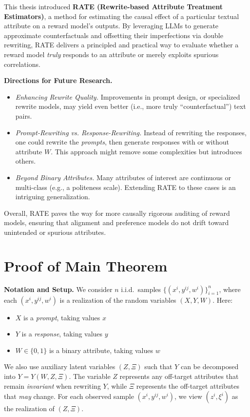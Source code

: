 This thesis introduced \textbf{RATE (Rewrite-based Attribute Treatment Estimators)}, a method for estimating the causal effect of a particular textual attribute on a reward model’s outputs. By leveraging LLMs to generate approximate counterfactuals and offsetting their imperfections via double rewriting, RATE delivers a principled and practical way to evaluate whether a reward model \emph{truly} responds to an attribute or merely exploits spurious correlations.

\textbf{Directions for Future Research.}
\begin{itemize}
    \item \emph{Enhancing Rewrite Quality.} Improvements in prompt design, or specialized rewrite models, may yield even better (i.e., more truly ``counterfactual'') text pairs.
    \item \emph{Prompt-Rewriting vs. Response-Rewriting.} Instead of rewriting the responses, one could rewrite the \emph{prompts}, then generate responses with or without attribute $W$. This approach might remove some complexities but introduces others.
    \item \emph{Beyond Binary Attributes.} Many attributes of interest are continuous or multi-class (e.g., a politeness scale). Extending RATE to these cases is an intriguing generalization.
\end{itemize}

Overall, RATE paves the way for more causally rigorous auditing of reward models, ensuring that alignment and preference models do not drift toward unintended or spurious attributes.

\newpage
\appendix
\section{Proof of Main Theorem}
\label{sec:proofs}
\noindent
\textbf{Notation and Setup.}
We consider $n$ i.i.d.\ samples $\{(x^i, y^{ij}, w^i)\}_{i=1}^n$, where each $(x^i, y^{ij}, w^i)$ is a realization of the random variables $(X, Y, W)$. Here:
\begin{itemize}
    \item $X$ is a \emph{prompt}, taking values $x$
    \item $Y$ is a \emph{response}, taking values $y$
    \item $W \in \{0,1\}$ is a binary attribute, taking values $w$
\end{itemize}
We also use auxiliary latent variables $(Z, \Xi)$ such that $Y$ can be decomposed into $Y = Y(W, Z, \Xi)$. The variable $Z$ represents any off-target attributes that remain \emph{invariant} when rewriting $Y$, while $\Xi$ represents the off-target attributes that \emph{may} change. For each observed sample $(x^i, y^{ij}, w^i)$, we view $(z^i,\xi^i)$ as the realization of $(Z, \Xi)$.

